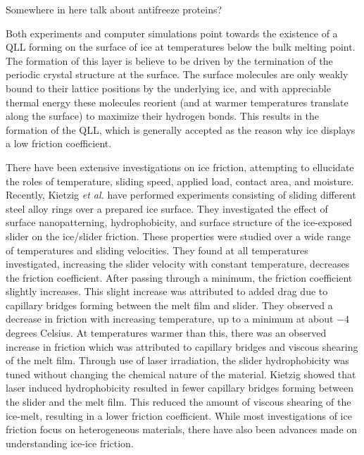 Somewhere in here talk about antifreeze proteins?

Both experiments and computer simulations point towards the existence of a
QLL forming on the surface of ice at temperatures below
the bulk melting point. The formation of this layer is believe to be
driven by the termination of the periodic crystal structure at the
surface. The surface molecules are only weakly bound to their lattice
positions by the underlying ice, and with appreciable thermal energy
these molecules reorient (and at warmer temperatures translate along
the surface) to maximize their hydrogen bonds. This results in the
formation of the QLL, which is generally accepted as the reason why
ice displays a low friction 
coefficient\cite{Malenkov2009,Dash1995,Rosenberg2005,Dash2006}.


There have been
extensive investigations on ice friction, attempting to ellucidate the
roles of temperature\cite{Roberts1981,Higgins2008,Bowden1939,Evans1976,Derjaguin1988,Liang2003}, sliding
speed\cite{Evans1976,Derjaguin1988,Liang2003}, applied load\cite{Buhl2001,Bowden1939,Derjaguin1988,Baurle2006,Oksanen1982},
contact area\cite{Bowden1939,Baurle2007}, and
moisture\cite{Calabrese1980}. Recently, 
Kietzig \textit{et al.} have performed experiments consisting of sliding 
different steel alloy rings over a prepared ice surface.\cite{Kietzig2009} 
They investigated the effect of surface nanopatterning, hydrophobicity, and 
surface structure of the ice-exposed slider on the ice/slider friction. 
These properties were studied over a wide 
range of temperatures and sliding velocities. They found at all temperatures 
investigated, increasing the slider velocity with constant temperature, 
decreases the friction coefficient. After passing through a minimum, the 
friction coefficient slightly increases. This slight increase was attributed 
to added drag due to capillary bridges forming between the melt film and 
slider. They observed a decrease in friction with increasing temperature, 
up to a minimum at about $-4$ 
degrees Celsius. At temperatures warmer than this, there was an observed 
increase in friction which was attributed to capillary bridges and viscous 
shearing of the melt film. 
Through use of laser irradiation, the slider hydrophobicity was tuned
without changing the chemical nature of the material. Kietzig
showed that laser induced hydrophobicity resulted in fewer capillary 
bridges forming between the slider and the melt film. This reduced the amount
of viscous shearing of the ice-melt, resulting in a lower 
friction coefficient. 
While most investigations of ice friction focus on heterogeneous
materials\cite{Bowden1939,Evans1976,Derjaguin1988,Liang2003,Liang2005,Baurle2006,Baurle2007,Kietzig2009,Kietzig2010},
there have also been advances made on understanding ice-ice friction\cite{Oksanen1982,Kennedy2000,Maeno2004,Fortt2007,Fortt2011,Lishman2011,Samadashvili2013}.

